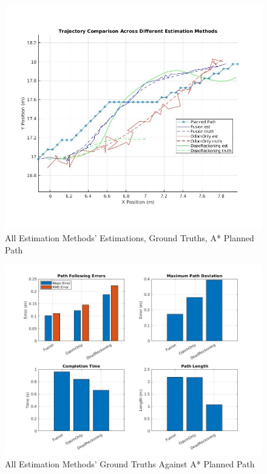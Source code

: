 \documentclass[
  letterpaper,
  DIV=11,
  numbers=noendperiod]{scrartcl}
\begin{document}
\begin{figure}

{\centering \includegraphics{all-estimations.png}

}

\caption{\label{fig-all-estimations}All Estimation Methods' Estimations,
Ground Truths, A* Planned Path}

\end{figure}

\begin{figure}

{\centering \includegraphics{path-comparison.png}

}

\caption{\label{fig-path-comparison}All Estimation Methods' Ground
Truths Against A* Planned Path}

\end{figure}
\end{document}
